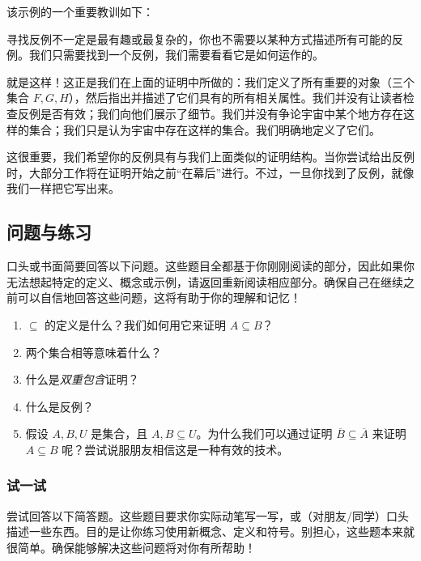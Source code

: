 该示例的一个重要教训如下：

\begin{center}
    寻找反例不一定是最有趣或最复杂的，你也不需要以某种方式描述所有可能的反例。我们只需要找到一个反例，我们需要看看它是如何运作的。
\end{center}

就是这样！这正是我们在上面的证明中所做的：我们定义了所有重要的对象（三个集合 $F,G,H$），然后指出并描述了它们具有的所有相关属性。我们并没有让读者检查反例是否有效；我们向他们展示了细节。我们并没有争论宇宙中某个地方存在这样的集合；我们只是认为宇宙中存在这样的集合。我们明确地定义了它们。

这很重要，我们希望你的反例具有与我们上面类似的证明结构。当你尝试给出反例时，大部分工作将在证明开始之前``在幕后''进行。不过，一旦你找到了反例，就像我们一样把它写出来。

\subsection{问题与练习}

口头或书面简要回答以下问题。这些题目全都基于你刚刚阅读的部分，因此如果你无法想起特定的定义、概念或示例，请返回重新阅读相应部分。确保自己在继续之前可以自信地回答这些问题，这将有助于你的理解和记忆！

\begin{enumerate}[label=(\arabic*)]
    \item $\subseteq$ 的定义是什么？我们如何用它来证明 $A \subseteq B$？
    \item 两个集合相等意味着什么？
    \item 什么是\emph{双重包含}证明？
    \item 什么是反例？
    \item 假设 $A,B,U$ 是集合，且 $A,B \subseteq U$。为什么我们可以通过证明 $\overline{B} \subseteq \overline{A}$ 来证明 $A \subseteq B$ 呢？尝试说服朋友相信这是一种有效的技术。
\end{enumerate}

\subsubsection*{试一试}

尝试回答以下简答题。这些题目要求你实际动笔写一写，或（对朋友/同学）口头描述一些东西。目的是让你练习使用新概念、定义和符号。别担心，这些题本来就很简单。确保能够解决这些问题将对你有所帮助！

